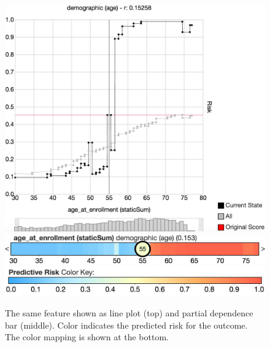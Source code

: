 \begin{figure}
\centering
\includegraphics[width=0.8\linewidth]{prospector/compress_1} \\  \vspace*{0.2em} %
\includegraphics[width=0.9\linewidth]{prospector/compress_2} \\  \vspace*{0.5em} %
\includegraphics[width=0.7\linewidth]{prospector/color_scale} %
\caption[The same feature shown as line plot and partial dependence bar.]{
The same feature shown as line plot (top) and partial dependence bar (middle).
Color indicates the predicted risk for the outcome.
The color mapping is shown at the bottom.
}
\label{figs:compress}
\end{figure}